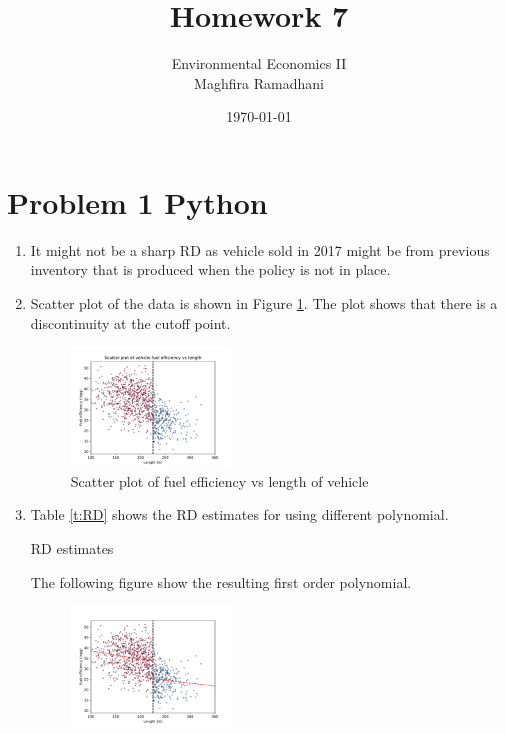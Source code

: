\documentclass{article}
\begin{document}
 
\title{Homework 7}
\author{Environmental Economics II\\
Maghfira Ramadhani}
\date{\today}
\maketitle

\section*{Problem 1 Python}
\begin{enumerate}
    \item It might not be a sharp RD as vehicle sold in 2017 might be from previous inventory that is produced when the policy is not in place.
    \item Scatter plot of the data is shown in Figure \ref{f1:scatter_plot}. The plot shows that there is a discontinuity at the cutoff point.
    \begin{figure}[H]
        \centering
        \includegraphics[width=0.4\textwidth]{./figure/scatterplot.pdf}
        \caption{Scatter plot of fuel efficiency vs length of vehicle}
        \label{f1:scatter_plot} 
    \end{figure}
    \item Table \ref{t:RD} shows the RD estimates for using different polynomial.
    \begin{table}[H]\centering
        \caption{RD estimates}
        \label{t:RD}
        \begin{threeparttable}
        
        \end{threeparttable}
        \end{table}
    The following figure show the resulting first order polynomial.
    \begin{figure}[H]
        \centering
        \includegraphics[width=0.4\textwidth]{./figure/RD_1.pdf}

\end{figure}
\end{enumerate}
\end{document}
